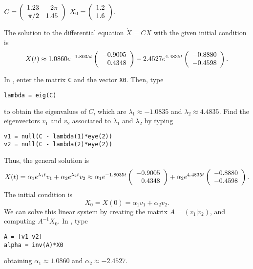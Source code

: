 \documentclass{ximera}
\begin{document}
\begin{exercise}  \label{c4.10A.3b}
$C = \left(\begin{array}{rr} 1.23 & 2\pi\\ \pi/2 &1.45\end{array}\right)$ \AND $X_0 = \left(\begin{array}{r} 1.2 \\ 1.6\end{array}\right)$.

\begin{solution}
\ans The solution to the differential equation $\dot{X}
= CX$ with the given initial condition is
\[
X(t) \approx 1.0860e^{-1.8035t}\left(\begin{array}{r} -0.9005 \\  0.4348\end{array}\right)
- 2.4527e^{4.4835t}\left(\begin{array}{r} -0.8880 \\ -0.4598\end{array}\right).
\]

\soln In \Matlabp, enter the matrix {\tt C} and the vector {\tt X0}.  Then,
type
\begin{verbatim}
lambda = eig(C)
\end{verbatim}
to obtain the eigenvalues of $C$, which are
$\lambda_1 \approx -1.0835$ and $\lambda_2 \approx 4.4835$.  Find the
eigenvectors $v_1$ and $v_2$ associated to $\lambda_1$ and $\lambda_2$
by typing
\begin{verbatim}
v1 = null(C - lambda(1)*eye(2))
v2 = null(C - lambda(2)*eye(2))
\end{verbatim}
Thus, the general solution is
\[
X(t) = \alpha_1e^{\lambda_1 t}v_1 + \alpha_2e^{\lambda_2 t}v_2
\approx \alpha_1e^{-1.8035t}\left(\begin{array}{r} -0.9005 \\  0.4348\end{array}\right) +
\alpha_2e^{4.4835t}\left(\begin{array}{r} -0.8880 \\ -0.4598\end{array}\right).
\]
The initial condition is
\[
X_0 = X(0) = \alpha_1v_1 + \alpha_2v_2.
\]
We can solve this linear system by creating the matrix $A = (v_1|v_2)$, and
computing $A^{-1}X_0$.  In \Matlabp, type
\begin{verbatim}
A = [v1 v2]
alpha = inv(A)*X0
\end{verbatim}
obtaining $\alpha_1 \approx 1.0860$ and $\alpha_2 \approx -2.4527$.

\end{solution}
\end{exercise}
\end{document}
